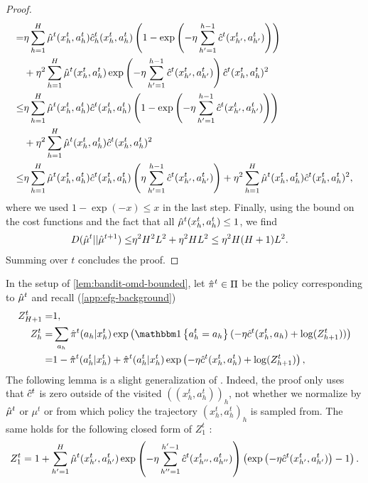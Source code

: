 \begin{proof}
\begin{align*}
         =& \eta\sum_{h=1}^H\hat{\mu}^t(x_h^t,a_h^t)\hat{c}^t_h(x_h^t,a_h^t)\left( 1-\exp\left( -\eta \sum_{h'=1}^{h-1} \hat{c}^t(x_{h'}^t,a_{h'}^t) \right) \right) \\
         &+ \eta^2\sum_{h=1}^H \hat{\mu}^t(x_{h}^t,a_{h}^t)\exp\left( -\eta \sum_{h'=1}^{h-1} \hat{c}^t(x_{h'}^t,a_{h'}^t) \right) \hat{c}^t(x_{h}^t,a_{h}^t)^2\\
         \leq& \eta\sum_{h=1}^H\hat{\mu}^t(x_h^t,a_h^t)\hat{c}^t(x_h^t,a_h^t)\left( 1-\exp\left( -\eta \sum_{h'=1}^{h-1} \hat{c}^t(x_{h'}^t,a_{h'}^t) \right) \right) \\
         &+ \eta^2\sum_{h=1}^H \hat{\mu}^t(x_{h}^t,a_{h}^t) \hat{c}^t(x_{h}^t,a_{h}^t)^2\\
         \leq& \eta\sum_{h=1}^H\hat{\mu}^t(x_h^t,a_h^t)\hat{c}^t(x_h^t,a_h^t)\left( \eta \sum_{h'=1}^{h-1} \hat{c}^t(x_{h'}^t,a_{h'}^t) \right) + \eta^2\sum_{h=1}^H \hat{\mu}^t(x_{h}^t,a_{h}^t) \hat{c}^t(x_{h}^t,a_{h}^t)^2,
     \end{align*}
     where we used $1-\exp(-x)\leq x$ in the last step. Finally, using the bound on the cost functions and the fact that all $\hat{\mu}^t(x_h^t,a_h^t) \leq 1$, we find
     \begin{align*}
         D(\hat{\mu}^t||\hat{\mu}^{t+1})\leq& \eta^2 H^2L^2 + \eta^2H L^2\leq \eta^2H(H+1) L^2.
     \end{align*}
     Summing over $t$ concludes the proof.
\end{proof}

\noindent In the setup of \cref{lem:bandit-omd-bounded}, let $\hat{\pi}^t\in\Pi$ be the policy corresponding to $\hat{\mu}^t$ and recall (\cref{app:efg-background})
\begin{align*}
    Z_{H+1}^t =& 1,\\
    Z_h^t =& \sum_{a_h} \piHat^t(a_h|x_h^t) \exp\round{\indicator{a_h^t=a_h}(-\eta\cHat^t(x_h^t,a_h)+\log(Z_{h+1}^t))}\\
    =& 1-\piHat^t(a_h^t|x_h^t)+\piHat^t(a_h^t|x_h^t)\exp\round{-\eta\cHat^t(x_h^t,a_h^t)+\log(Z^t_{h+1})},
\end{align*}
\noindent The following lemma is a slight generalization of \citet{kozuno2021model}. Indeed, the proof only uses that $\hat{c}^t$ is zero outside of the visited $((x_h^t,a_h^t))_h$, not whether we normalize by $\hat{\mu}^t$ or $\mu^t$ or from which policy the trajectory $(x_h^t,a_h^t)_h$ is sampled from. The same holds for the following closed form of $Z_1^t$ \citep[c.f. Lemma 6]{kozuno2021model}:
\begin{align}
    Z_1^t = 1 + \sum_{h'=1}^H \hat{\mu}^t(x_{h'}^t,a_{h'}^t)\exp\left( -\eta \sum_{h''=1}^{h'-1} \hat{c}^t(x_{h''}^t,a_{h''}^t) \right) \left( \exp\left( -\eta\hat{c}^t(x_{h'}^t,a_{h'}^t) \right) - 1 \right). \label{eq:Z-closed-form}
\end{align}

